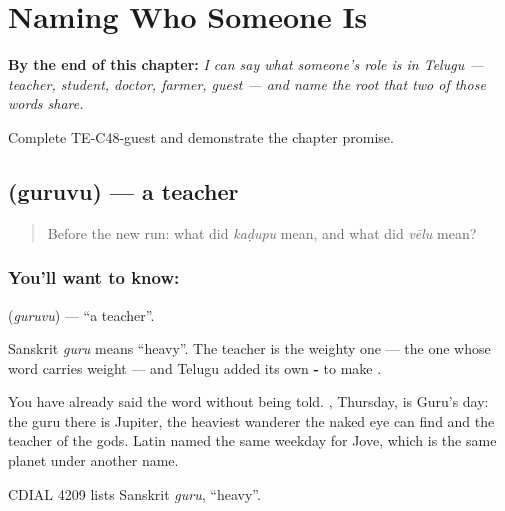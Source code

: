 
\chapter{Naming Who Someone Is}
\label{ch:te-roles}

\begin{chapteropening}
\textbf{By the end of this chapter:} \emph{I can say what someone's role is in Telugu --- teacher, student, doctor, farmer, guest --- and name the root that two of those words share.}

Complete TE-C48-guest and demonstrate the chapter promise.
\end{chapteropening}

\section[\texorpdfstring{\te{గురువు} (guruvu)}{గురువు (guruvu)}]{ (guruvu) — a teacher}

\label{lesson:TE-C48-teacher}



\begin{quote}
Before the new run: what did \emph{kaḍupu} mean, and what did \emph{vēlu} mean?
\end{quote}

\subsection*{You'll want to know: }
\textbf{} (\emph{guruvu}) — \textquotedblleft{}a teacher\textquotedblright{}.

Sanskrit \emph{guru} means \textquotedblleft{}heavy\textquotedblright{}. The teacher is the weighty one — the one whose word carries weight — and Telugu added its own \textbf{-} to make .

You have already said the word without being told. , Thursday, is Guru's day: the guru there is Jupiter, the heaviest wanderer the naked eye can find and the teacher of the gods. Latin named the same weekday for Jove, which is the same planet under another name.

CDIAL 4209 lists Sanskrit \emph{guru}, \textquotedblleft{}heavy\textquotedblright{}.

